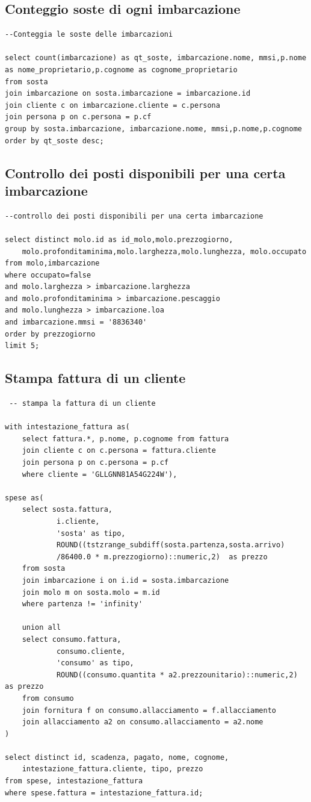 \subsection{Conteggio soste di ogni imbarcazione}

\begin{lstlisting}
--Conteggia le soste delle imbarcazioni

select count(imbarcazione) as qt_soste, imbarcazione.nome, mmsi,p.nome as nome_proprietario,p.cognome as cognome_proprietario
from sosta
join imbarcazione on sosta.imbarcazione = imbarcazione.id
join cliente c on imbarcazione.cliente = c.persona
join persona p on c.persona = p.cf
group by sosta.imbarcazione, imbarcazione.nome, mmsi,p.nome,p.cognome
order by qt_soste desc;
\end{lstlisting}

\subsection{Controllo dei posti disponibili per una certa imbarcazione}
\begin{lstlisting}
--controllo dei posti disponibili per una certa imbarcazione

select distinct molo.id as id_molo,molo.prezzogiorno,
    molo.profonditaminima,molo.larghezza,molo.lunghezza, molo.occupato
from molo,imbarcazione
where occupato=false
and molo.larghezza > imbarcazione.larghezza
and molo.profonditaminima > imbarcazione.pescaggio
and molo.lunghezza > imbarcazione.loa
and imbarcazione.mmsi = '8836340'
order by prezzogiorno
limit 5;
\end{lstlisting}

\subsection{Stampa fattura di un cliente}

\begin{lstlisting}
 -- stampa la fattura di un cliente

with intestazione_fattura as(
    select fattura.*, p.nome, p.cognome from fattura
    join cliente c on c.persona = fattura.cliente
    join persona p on c.persona = p.cf
    where cliente = 'GLLGNN81A54G224W'),

spese as(
    select sosta.fattura,
            i.cliente,
            'sosta' as tipo,
            ROUND((tstzrange_subdiff(sosta.partenza,sosta.arrivo)
            /86400.0 * m.prezzogiorno)::numeric,2)  as prezzo
    from sosta
    join imbarcazione i on i.id = sosta.imbarcazione
    join molo m on sosta.molo = m.id
    where partenza != 'infinity'

    union all
    select consumo.fattura,
            consumo.cliente,
            'consumo' as tipo,
            ROUND((consumo.quantita * a2.prezzounitario)::numeric,2) as prezzo
    from consumo
    join fornitura f on consumo.allacciamento = f.allacciamento
    join allacciamento a2 on consumo.allacciamento = a2.nome
)

select distinct id, scadenza, pagato, nome, cognome,
    intestazione_fattura.cliente, tipo, prezzo
from spese, intestazione_fattura
where spese.fattura = intestazione_fattura.id;
\end{lstlisting}

